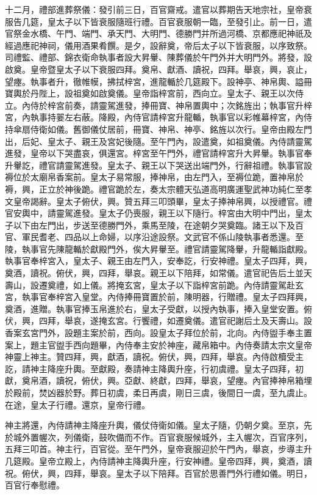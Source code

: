 十二月，禮部進葬祭儀：發引前三日，百官齋戒。遣官以葬期告天地宗社，皇帝衰服告几筵，皇太子以下皆衰服隨班行禮。百官衰服朝一臨，至發引止。前一日，遣官祭金水橋、午門、端門、承天門、大明門、德勝門并所過河橋、京都應祀神祇及經過應祀神祠，儀用酒果肴饌。是夕，設辭奠，帝后太子以下皆衰服，以序致祭。司禮監、禮部、錦衣衛命執事者設大昇轝、陳葬儀於午門外并大明門外。將發，設啟奠。皇帝暨皇太子以下衰服四拜。奠帛、獻酒、讀祝，四拜。舉哀，興，哀止，望瘞。執事者升，徹帷幙，拂拭梓宮，進龍輴於几筵殿下。設神亭、神帛輿、謚冊寶輿於丹陛上，設祖奠如啟奠儀。皇帝詣梓宮前，西向立。皇太子、親王以次侍立。內侍於梓宮前奏，請靈駕進發，捧冊寶、神帛置輿中；次銘旌出；執事官升梓宮，內執事持翣左右蔽。降殿，內侍官請梓宮升龍輴，執事官以彩帷幕梓宮，內侍持傘扇侍衛如儀。舊御儀仗居前，冊寶、神帛、神亭、銘旌以次行。皇帝由殿左門出，后妃、皇太子、親王及宮妃後隨。至午門內，設遣奠，如祖奠儀。內侍請靈駕進發，皇帝以下哭盡哀，俱還宮。梓宮至午門外，禮官請梓宮升大昇轝。執事官奉升轝訖，禮官請靈駕進發。皇太子、親王以下哭送出端門外，行辭祖禮。執事官設褥位於太廟帛香案前。皇太子易常服，捧神帛，由左門入，至褥位跪，置神帛於褥，興，正立於神後跪。禮官跪於左，奏太宗體天弘道高明廣運聖武神功純仁至孝文皇帝謁辭。皇太子俯伏，興。贊五拜三叩頭畢，皇太子捧神帛興，以授禮官。禮官安輿中，請靈駕進發。皇太子仍喪服，親王以下隨行。梓宮由大明中門出，皇太子以下由左門出，步送至德勝門外，乘馬至陵，在途朝夕哭奠臨。諸王以下及百官、軍民耆老、四品以上命婦，以序沿途設祭。文武官不係山陵執事者悉還。至陵，執事官先陳龍輴於獻殿門外，俟大昇轝至。禮官請靈駕降轝，升龍輴詣獻殿。執事官奉梓宮入，皇太子、親王由左門入，安奉訖，行安神禮。皇太子四拜，興，奠酒，讀祝。俯伏，興，四拜，舉哀。親王以下陪拜，如常儀。遣官祀告后土並天壽山，設遷奠禮，如上儀。將掩玄宮，皇太子以下詣梓宮前跪。內侍請靈駕赴玄宮，執事官奉梓宮入皇堂。內侍捧冊寶置於前，陳明器，行贈禮。皇太子四拜興，奠酒，進贈。執事官捧玉帛進於右，皇太子受獻，以授內執事，捧入皇堂安置。俯伏，興，四拜，舉哀，遂掩玄宮。行饗禮，如遷奠儀。遣官祀謝后土及天壽山。設香案玄宮門外，設題主案於前，西向。設皇太子拜位於前，北向。內侍盥手奉主置案上，題主官盥手西向題畢，內侍奉主安於神座，藏帛箱中。內侍奏請太宗文皇帝神靈上神主。贊四拜，興，獻酒，讀祝。俯伏，興，四拜，舉哀。內侍啟櫝受主訖，請神主降座升輿。至獻殿，奏請神主降輿升座，行初虞禮。皇太子四拜，初獻，奠帛酒，讀祝，俯伏，興。亞獻、終獻，四拜，舉哀，望瘞。內官捧神帛箱埋於殿前，焚凶器於野。葬日初虞，柔日再虞，剛日三虞，後間日一虞，至九虞止。在途，皇太子行禮。還京，皇帝行禮。

神主將還，內侍請神主降座升輿，儀仗侍衛如儀。皇太子隨，仍朝夕奠。至京，先於城外置幄次，列儀衛，鼓吹備而不作。百官衰服候城外，主入幄次，百官序列，五拜三叩首。神主行，百官從。至午門外，皇帝衰服迎於午門內，舉哀，步導主升几筵殿。皇帝立殿上，內侍請神主降輿升座，行安神禮。皇帝四拜，興，奠酒，讀祝。俯伏，興，四拜，舉哀。皇太子以下陪拜。百官於思善門外行禮如儀。明日，百官行奉慰禮。

